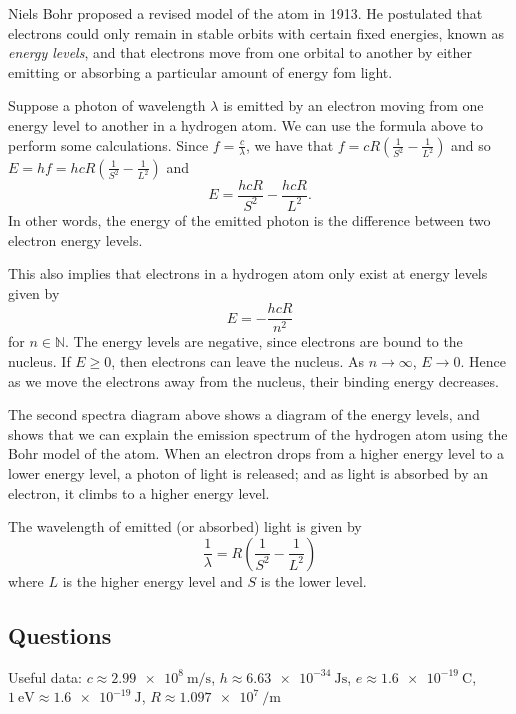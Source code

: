 \documentclass[answers]{exam}
\theoremstyle{definition}
\begin{document}
Niels Bohr proposed a revised model of the atom in 1913. He postulated that electrons could
only remain in stable orbits with certain fixed energies, known as \textit{energy levels},
and that electrons move from one orbital to another by either emitting or absorbing a particular
amount of energy fom light.

Suppose a photon of wavelength $ \lambda $ is emitted by an electron moving from one energy level
to another in a hydrogen atom. We can use the formula above to perform some calculations.
Since $ f = \frac{c}{\lambda} $, we have that $ f = cR \left( \frac{1}{S^2} - \frac{1}{L^2} \right) $
and so $ E = hf = hcR \left( \frac{1}{S^2} - \frac{1}{L^2} \right) $ and
\begin{displaymath}
  E = \frac{hcR}{S^2} - \frac{hcR}{L^2}.
\end{displaymath}
In other words, the energy of the emitted photon is the difference between two electron energy levels.

This also implies that electrons in a hydrogen atom only exist at energy levels given by
\begin{displaymath}
  E = -\frac{hcR}{n^2}
\end{displaymath}
for $ n \in \mathbb{N} $.
The energy levels are negative, since electrons are bound to the nucleus. If $ E \geq 0 $,
then electrons can leave the nucleus. As $ n \to\infty $, $ E \to 0 $. Hence as we move the
electrons away from the nucleus, their binding energy decreases.

The second spectra diagram above shows a diagram of the energy levels, and shows that we
can explain the emission spectrum of the hydrogen atom using the Bohr model of the atom. When
an electron drops from a higher energy level to a lower energy level, a photon of light
is released; and as light is absorbed by an electron, it climbs to a higher energy level.

The wavelength of emitted (or absorbed) light is given by
\begin{displaymath}
  \frac{1}{\lambda} = R\left( \frac{1}{S^2} - \frac{1}{L^2} \right)
\end{displaymath}
where $ L $ is the higher energy level and $ S $ is the lower level.

\subsection*{Questions}
Useful data: $ c \approx \SI{2.99e8}{\metre\per\second} $, $ h \approx \SI{6.63e-34}{\joule\second} $,
$ e \approx \SI{1.6e-19}{\coulomb} $, $ \SI{1}{\electronvolt} \approx \SI{1.6e-19}{\joule} $, $ R \approx \SI{1.097e7}{\per\metre} $
\end{document}
